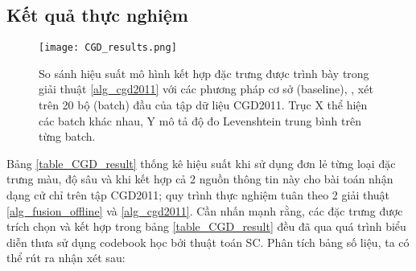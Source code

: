 \subsection{Kết quả thực nghiệm}	
\begin{figure}
\centering
\texttt{[image: CGD\_results.png]}
\caption{So sánh hiệu suất mô hình kết hợp đặc trưng được trình bày trong giải thuật \ref{alg_cgd2011} với các phương pháp cơ sở (baseline)\cite{Isabelle_Chalearn}, \cite{Isabelle_Baseline}, xét trên 20 bộ (batch) đầu của tập dữ liệu CGD2011\cite{chalearn_dataset}. Trục X thể hiện các batch khác nhau, Y mô tả độ đo Levenshtein trung bình trên từng batch.}
\label{fig_cgd_results}
\end{figure}
Bảng \ref{table_CGD_result} thống kê hiệu suất khi sử dụng đơn lẻ từng loại đặc trưng màu, độ sâu và khi kết hợp cả 2 nguồn thông tin này cho bài toán nhận dạng cử chỉ trên tập CGD2011; quy trình thực nghiệm tuân theo 2 giải thuật \ref{alg_fusion_offline} và \ref{alg_cgd2011}. Cần nhấn mạnh rằng, các đặc trưng được trích chọn và kết hợp trong bảng \ref{table_CGD_result} đều đã qua quá trình biểu diễn thưa sử dụng codebook học bởi thuật toán SC. Phân tích bảng số liệu, ta có thể rút ra nhận xét sau: 
